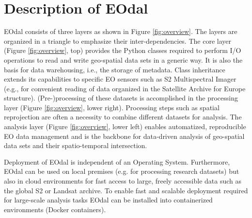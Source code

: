 \section{Description of EOdal}
\label{sec:package_struc}
\gls{EOdal} consists of three layers as shown in Figure \ref{fig:overview}. The layers are organized in a triangle to emphasize their inter-dependencies. The core layer (Figure \ref{fig:overview}, top) provides the Python classes required to perform I/O operations to read and write geo-spatial data sets in a generic way. It is also the basis for data warehousing, i.e., the storage of metadata. Class inheritance extends its capabilities to specific \gls{EO} sensors such as \gls{S2} Multispectral Imager (e.g., for convenient reading of data organized in the Satellite Archive for Europe structure). (Pre-)processing of these datasets is accomplished in the processing layer (Figure \ref{fig:overview}, lower right). Processing steps such as spatial reprojection are often a necessity to combine different datasets for analysis. The analysis layer (Figure \ref{fig:overview}, lower left) enables automatized, reproducible \gls{EO} data management and is the backbone for data-driven analysis of geo-spatial data sets and their spatio-temporal intersection.

Deployment of \gls{EOdal} is independent of an Operating System. Furthermore, \gls{EOdal} can be used on local premises (e.g. for processing research datasets) but also in cloud environments for fast access to large, freely accessible data such as the global \gls{S2} or Landsat archive. To enable fast and scalable deployment required for large-scale analysis tasks \gls{EOdal} can be installed into containerized environments (Docker containers).

